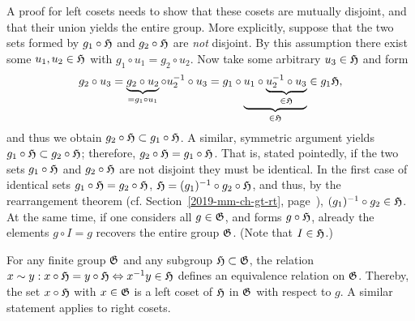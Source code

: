 {\color{OliveGreen}
\bproof
A proof for left cosets needs to show that
these cosets are mutually disjoint,
and that their union yields the entire group.
More explicitly, suppose that the two sets formed by
$g_1 \circ {\frak H}$ and $g_2 \circ {\frak H}$
are {\em not} disjoint.
By this assumption there exist some $u_1, u_2 \in {\frak H}$
with $g_1 \circ u_1 = g_2 \circ u_2$.
Now take some arbitrary $u_3 \in {\frak H}$ and form
\begin{equation}
g_2 \circ u_3 =
\underbrace{g_2 \circ u_2}_{ =g_1 \circ u_1}  \circ u_2^{-1} \circ u_3 =
g_1 \circ
\underbrace{u_1 \circ
\underbrace{u_2^{-1} \circ u_3}_{\in {\frak H}}
}_{\in {\frak H}} \in g_1{\frak H}
,
\end{equation}
and thus we obtain
$g_2 \circ {\frak H} \subset g_1 \circ {\frak H}$.
A similar, symmetric argument yields
$g_1 \circ {\frak H} \subset g_2 \circ {\frak H}$;
therefore,
$g_2 \circ {\frak H} = g_1 \circ {\frak H}$.
That is, stated pointedly, if
the two sets
$g_1 \circ {\frak H}$ and $g_2 \circ {\frak H}$
are not disjoint they must be
identical.
In the first case of identical sets
$g_1 \circ {\frak H}=g_2 \circ {\frak H}$,
${\frak H}=(g_1)^{-1} \circ g_2 \circ {\frak H}$,
and thus, by the rearrangement theorem
(cf. Section~\ref{2019-mm-ch-gt-rt}, page~\pageref{2019-mm-ch-gt-rt}),
$(g_1)^{-1} \circ g_2 \in {\frak H}$.
At the same time, if one considers all
$g \in {\frak G}$,
and forms $g \circ {\frak H}$, already the elements $g \circ I = g$
recovers the entire group ${\frak G}$. (Note that $I \in {\frak H}$.)
\eproof
}



For any finite group ${\frak G}$ and any subgroup ${\frak H} \subset {\frak G}$,
the relation
$x \sim y:
x\circ {\frak H} = y\circ {\frak H}
\Leftrightarrow x^{-1}y \in {\frak H}$
defines an equivalence relation
on ${\frak G}$.
Thereby, the set $x\circ {\frak H}$ with $x\in {\frak G}$ is a
left coset of ${\frak H}$ in ${\frak G}$ with respect to $g$.
A similar statement applies to right cosets.

